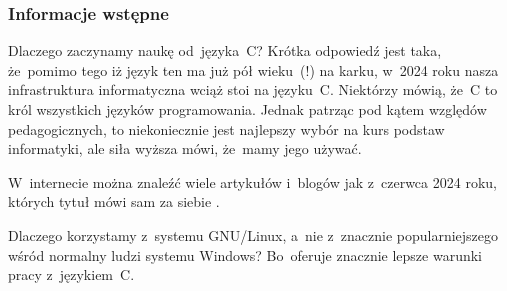 \documentclass[10pt,t]{beamer}
\begin{document}
\begin{frame}
  \frametitle{Informacje wstępne}


  Dlaczego zaczynamy naukę od~języka~C? Krótka odpowiedź jest taka,
  że~pomimo tego iż język ten ma już pół wieku~(!) na karku, w~2024 roku
  nasza infrastruktura informatyczna wciąż stoi na języku~C. Niektórzy
  mówią, że~C to król wszystkich języków programowania. Jednak patrząc pod
  kątem względów pedagogicznych, to niekoniecznie jest najlepszy wybór
  na kurs podstaw informatyki, ale siła wyższa mówi, że~mamy jego używać.

  W~internecie można znaleźć wiele artykułów i~blogów jak
  z~czerwca 2024 roku, których tytuł mówi sam za siebie
  \parencite{Scott-C-programming-is-still-ETC-Ver-2024}.

  Dlaczego korzystamy z~systemu GNU/Linux, a~nie z~znacznie
  popularniejszego wśród normalny ludzi systemu Windows? Bo~oferuje
  znacznie lepsze warunki pracy z~językiem~C.

\end{frame}
\end{document}
